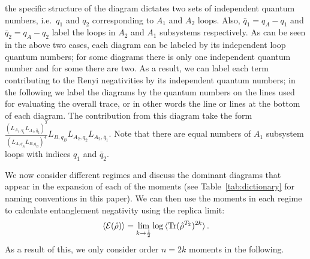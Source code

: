 \documentclass[aps,pra,reprint,superscriptaddress,twocolumn,notitlepage]{revtex4-1}
\newcommand{\Tr}{\text{Tr}}
\numberwithin{equation}{section}
\begin{document}
the specific structure of the diagram dictates two sets of independent quantum numbers, i.e.~$q_1$ and $q_2$ corresponding to $A_1$ and $A_2$ loops. Also, $\bar{q}_1 = q_A-q_1$ and $\bar{q}_2 = q_A-q_2$ label the loops in $A_2$ and $A_1$ subsystems respectively. As can be seen in the above two cases, each diagram can be labeled by its independent loop quantum numbers; for some diagrams there is only one independent quantum number and for some there are two. As a result, we can label each term contributing to the Renyi negativities by its independent quantum numbers; in the following we label the diagrams by the quantum numbers on the lines used for evaluating the overall trace, or in other words the line or lines at the bottom of each diagram. The contribution from this diagram take the form 
$ \frac{(L_{A_1,q_1} L_{A_1,\bar{q}_2})^2}{ (L_{A,q_A}L_{B,q_B})^4 } L_{B,q_B} L_{A_2,q_2} L_{A_2,\bar{q}_1} . $ 
Note that there are equal numbers of $A_1$ subsystem loops with indices $q_1$ and $\bar{q}_2$.


We now consider different regimes and discuss the dominant diagrams that appear in the expansion of each of the moments (see Table~\ref{tab:dictionary} for naming conventions in this paper). We can then use the moments in each regime to calculate entanglement negativity using the replica limit:
\begin{equation}
    \braket{{\cal E} (\hat\rho)}= \lim_{k\to \frac{1}{2}} \log \braket{\Tr(\hat\rho^{T_2})^{2k}}.
    \label{eq:replicalimit}
\end{equation}
As a result of this, we only consider order $n=2k$ moments in the following.
\end{document}
